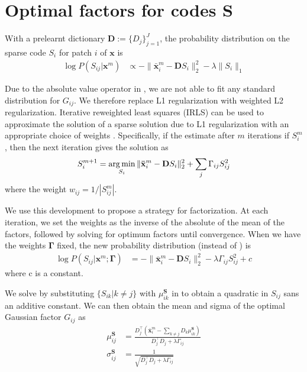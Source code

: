 \chapter{Optimal factors for codes $\mathbf{S}$ }
\label{app:factorParamsS}

With a prelearnt dictionary $\mathbf{D} := \lbrace D_j \rbrace_{j=1}^{J}$, the probability distribution on the sparse code $S_i$ for patch $i$ of $\mathbf{x}$ is
\begin{align}
\log P(S_{ij} | \mathbf{x}^m) &\propto - \| \mathbf{\bar{x}}^m_i - \mathbf{D} S_i \|_2^2 - \lambda \| S_i \|_1 \label{eqn:deriveSFactors}
\end{align}

Due to the absolute value operator in , we are not able to fit any standard distribution for $G_{ij}$. We therefore replace L1 regularization with weighted L2 regularization. Iterative reweighted least squares (IRLS) can be used to approximate the solution of a sparse solution due to L1 regularization with an appropriate choice of weights \cite{chartrand2008iteratively}. Specifically, if the estimate after $m$ iterations if $S^m_i$, then the next iteration gives the solution as
\begin{align}
S^{m+1}_i = \operatorname*{arg\,min}_{S_i} \| \mathbf{\bar{x}}^m_i - \mathbf{D} S_i \|^2_2 + \sum_{j} \Gamma_{ij} S_{ij}^2
\end{align}
where the weight $w_{ij} = 1/| S^m_{ij} |$.

We use this development to propose a strategy for factorization. At each iteration, we set the weights as the inverse of the absolute of the mean of the factors, followed by solving for optimum factors until convergence. When we have the weights $\mathbf{\Gamma}$ fixed, the new probability distribution (instead of ) is
\begin{align}
\log P(S_{ij} | \mathbf{x}^m; \mathbf{\Gamma}) &= - \| \mathbf{\bar{x}}^m_i - \mathbf{D} S_i \|_2^2 - \lambda \Gamma_{ij} S_{ij}^2 + c \label{eqn:deriveSFactors2}
\end{align}
where c is a constant.

We solve  by substituting $\lbrace S_{ik} | k \neq j \rbrace$ with $\mu^\mathbf{S}_{ik}$ in  to obtain a quadratic in $S_{ij}$ sans an additive constant. We can then obtain the mean and sigma of the optimal Gaussian factor $G_{ij}$ as
\begin{align}
\mu^\mathbf{S}_{ij} &= \frac{ D_j^\intercal \left( \mathbf{\bar{x}}^m_i - \sum_{k \neq j} D_k \mu^\mathbf{S}_{ik} \right) }{ D_j^\intercal D_j + \lambda \Gamma_{ij} } \\
\sigma^\mathbf{S}_{ij} &= \frac{1}{\sqrt{ D_j^\intercal D_j + \lambda \Gamma_{ij} }}
\end{align}